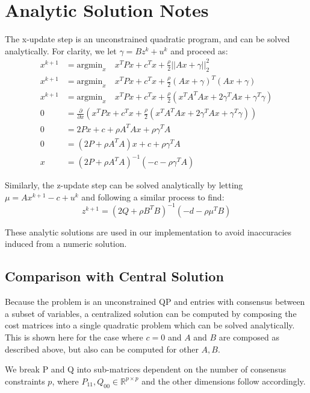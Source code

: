 \section{Analytic Solution Notes}\label{sec:appendix_analyticSolution}

The x-update step is an unconstrained quadratic program, and can be solved analytically. For clarity, we let $\gamma = Bz^k + u^k$ and proceed as:
\begin{align*}
x^{k+1} &= \text{argmin}_x \quad x^T P x + c^T x + \frac{\rho}{2}||Ax+\gamma||^2_2 \\
x^{k+1} &= \text{argmin}_x \quad x^T P x + c^T x + \frac{\rho}{2}(Ax+\gamma)^T (Ax+\gamma)\\
x^{k+1} &= \text{argmin}_x \quad x^T P x + c^T x + \frac{\rho}{2}(x^T A^T Ax + 2 \gamma^T Ax + \gamma^T \gamma)\\
0 &= \frac{\partial}{\partial x} \left( x^T P x + c^T x + \frac{\rho}{2}(x^T A^T Ax + 2 \gamma^T Ax + \gamma^T \gamma) \right)\\
0 &= 2 P x + c + \rho A^T A x + \rho \gamma^T A\\
0 &= (2P + \rho A^T A)x + c + \rho \gamma^T A \\
x &= (2P + \rho A^T A)^{-1}(-c - \rho \gamma^T A)
\end{align*}

Similarly, the z-update step can be solved analytically by letting $\mu=Ax^{k+1} - c + u^k$ and following a similar process to find:
$$
z^{k+1} = (2Q + \rho B^T B)^{-1} (-d - \rho \mu^T B)
$$

These analytic solutions are used in our implementation to avoid inaccuracies induced from a numeric solution.

\subsection{Comparison with Central Solution}
Because the problem is an unconstrained QP and entries with consensus between a subset of variables, a centralized solution can be computed by composing the cost matrices into a single quadratic problem which can be solved analytically.  This is shown here for the case where $c=0$ and $A$ and $B$ are composed as described above, but also can be computed for other $A,B$.

We break P and Q into sub-matrices dependent on the number of consensus constraints $p$, where $P_{11}, Q_{00} \in \mathbb{R}^{p \times p}$ and the other dimensions follow accordingly.

